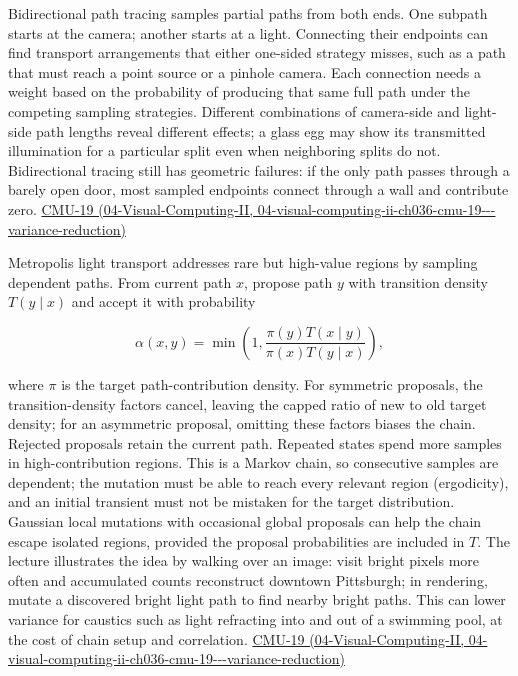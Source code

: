 Bidirectional path tracing samples partial paths from both ends. One subpath starts at the camera; another starts at a light. Connecting their endpoints can find transport arrangements that either one-sided strategy misses, such as a path that must reach a point source or a pinhole camera. Each connection needs a weight based on the probability of producing that same full path under the competing sampling strategies. Different combinations of camera-side and light-side path lengths reveal different effects; a glass egg may show its transmitted illumination for a particular split even when neighboring splits do not. Bidirectional tracing still has geometric failures: if the only path passes through a barely open door, most sampled endpoints connect through a wall and contribute zero. \href{../04-Visual-Computing-II/main.pdf\#nameddest=04-visual-computing-ii-ch036-cmu-19---variance-reduction}{CMU-19 (04-Visual-Computing-II, 04-visual-computing-ii-ch036-cmu-19-\/-\/-variance-reduction)}

Metropolis light transport addresses rare but high-value regions by sampling dependent paths. From current path \(x\), propose path \(y\) with transition density \(T(y\mid x)\) and accept it with probability

\[
\alpha(x,y)=\min\!\left(1,\frac{\pi(y)T(x\mid y)}{\pi(x)T(y\mid x)}\right),
\]

where \(\pi\) is the target path-contribution density. For symmetric proposals, the transition-density factors cancel, leaving the capped ratio of new to old target density; for an asymmetric proposal, omitting these factors biases the chain. Rejected proposals retain the current path. Repeated states spend more samples in high-contribution regions. This is a Markov chain, so consecutive samples are dependent; the mutation must be able to reach every relevant region (ergodicity), and an initial transient must not be mistaken for the target distribution. Gaussian local mutations with occasional global proposals can help the chain escape isolated regions, provided the proposal probabilities are included in \(T\). The lecture illustrates the idea by walking over an image: visit bright pixels more often and accumulated counts reconstruct downtown Pittsburgh; in rendering, mutate a discovered bright light path to find nearby bright paths. This can lower variance for caustics such as light refracting into and out of a swimming pool, at the cost of chain setup and correlation. \href{../04-Visual-Computing-II/main.pdf\#nameddest=04-visual-computing-ii-ch036-cmu-19---variance-reduction}{CMU-19 (04-Visual-Computing-II, 04-visual-computing-ii-ch036-cmu-19-\/-\/-variance-reduction)}

